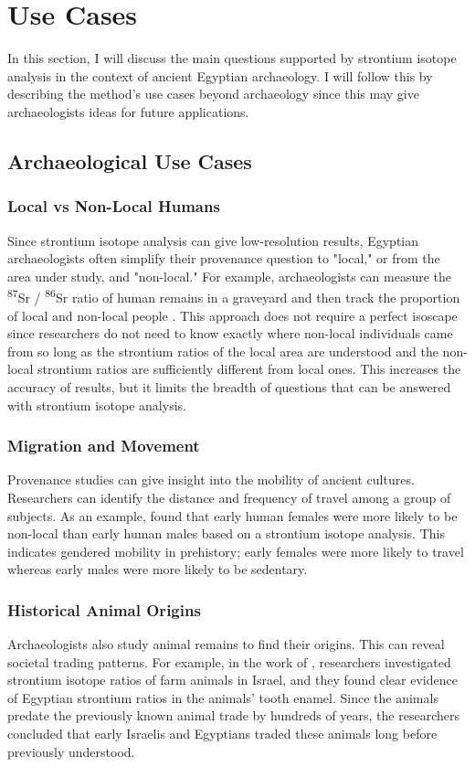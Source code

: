 \documentclass[a4paper, 12pt]{article}
\begin{document}
\section{Use Cases}
In this section, I will discuss the main questions supported by strontium isotope
analysis in the context of ancient Egyptian archaeology. I will follow this
by describing the method's use cases beyond archaeology since this may give
archaeologists ideas for future applications.

\subsection{Archaeological Use Cases}
\subsubsection{Local vs Non-Local Humans}
Since strontium isotope analysis can give low-resolution results, Egyptian archaeologists
often simplify their provenance question to "local," or from the area under study,
and "non-local." For example, archaeologists can measure the
\textsuperscript{87}Sr / \textsuperscript{86}Sr ratio
of human remains in a graveyard and then track the proportion of local and
non-local people \citep{holt2021}. This approach does not require
a perfect isoscape since researchers do not need to know exactly where non-local
individuals came from so long as the strontium ratios of the local area are understood and the non-local
strontium ratios are sufficiently different from local ones. This increases the accuracy of results, but it limits the breadth
of questions that can be answered with strontium isotope analysis.


\subsubsection{Migration and Movement}
Provenance studies can give insight into the mobility of ancient cultures. Researchers
can identify the distance and frequency of travel among a group of subjects. As an example, \cite{copeland2011} found that early human females were more likely
to be non-local than early human males based on a strontium isotope analysis.
This indicates gendered mobility in prehistory; early females were more likely to travel whereas early males
were more likely to be sedentary.

\subsubsection{Historical Animal Origins}
Archaeologists also study animal remains
to find their origins. This can reveal societal trading patterns. For example, in the work of \cite{arnold2016}, researchers investigated strontium isotope ratios of
farm animals in Israel, and they found clear evidence of
Egyptian strontium ratios in the animals' tooth enamel. Since the animals predate
the previously known animal trade by hundreds of years, the researchers concluded
that early Israelis and Egyptians traded these animals long before previously understood.
\end{document}
